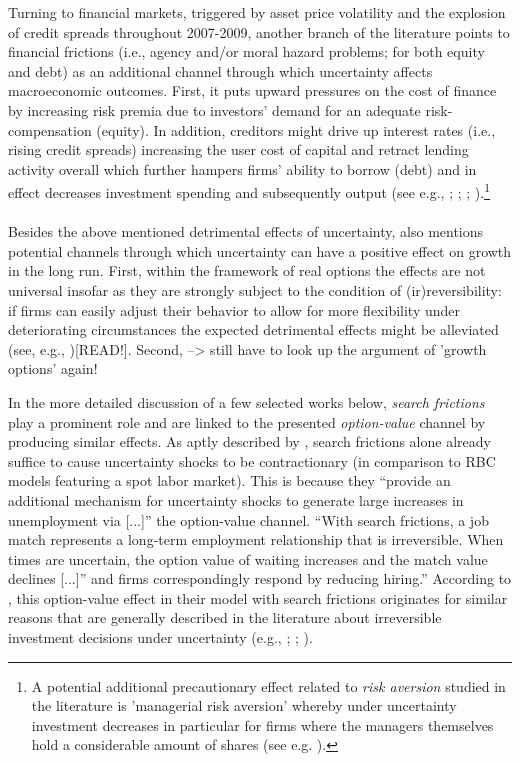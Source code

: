\documentclass[a4paper,11pt,listof=nochaptergap,oneside,pointednumbers,bibtotoc,bigheadings,liststotoc]{scrbook}
\begin{document}
Turning to financial markets, triggered by asset price volatility and the explosion of credit spreads throughout 2007-2009, another branch of the literature points to financial frictions (i.e., agency and/or moral hazard problems; for both equity and debt) as an additional channel through which uncertainty affects macroeconomic outcomes. First, it puts upward pressures on the cost of finance by increasing risk premia due to investors' demand for an adequate risk-compensation (equity). In addition, creditors might drive up interest rates (i.e., rising credit spreads) increasing the user cost of capital and retract lending activity overall which further hampers firms' ability to borrow (debt) and in effect decreases investment spending and subsequently output (see e.g., \citealp{gilchristetal:14}; \citealp{christianoetal:14}; \citealp{arenalloetal:11}; \citealp{arellanoetal:16}).\footnote{A potential additional precautionary effect related to \textit{risk aversion} studied in the literature is 'managerial risk aversion' whereby under uncertainty investment decreases in particular for firms where the managers themselves hold a considerable amount of shares (see e.g. \citealp{panousiandpananikolaou:12}).}\\
\\
Besides the above mentioned detrimental effects of uncertainty, \citet{bloom:14} also mentions potential channels through which uncertainty can have a positive effect on growth in the long run. First, within the framework of real options the effects are not universal insofar as they are strongly subject to the condition of (ir)reversibility: if firms can easily adjust their behavior to allow for more flexibility under deteriorating circumstances the expected detrimental effects might be alleviated (see, e.g., \citealp{vallettaandbengali:13})[READ!]. Second, --> still have to look up the argument of 'growth options' again!

In the more detailed discussion of a few selected works below, \textit{search frictions} play a prominent role and are linked to the presented \textit{option-value} channel by producing similar effects. As aptly described by \citet{leducandliu:16}, search frictions alone already suffice to cause uncertainty shocks to be contractionary (in comparison to RBC models featuring a spot labor market). This is because they ``provide an additional mechanism for uncertainty shocks to generate large increases in unemployment via [...]'' the option-value channel. ``With search frictions, a job match represents a long-term employment relationship that is irreversible. When times are uncertain, the option value of waiting increases and the match value declines [...]'' and firms correspondingly respond by reducing hiring.'' According to \citet{leducandliu:16}, this option-value effect in their model with search frictions originates for similar reasons that are generally described in the literature about irreversible investment decisions under uncertainty (e.g., \citealp{bernanke:83}; \citealp{bloom:09}; \citealp{bloometal:12}).
\end{document}
